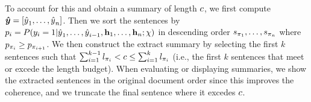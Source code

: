 To account for this and obtain a summary of length $c$, 
we first compute $\boldsymbol{\hat{y}} = \left[{\hat{y}}_1,\ldots,{\hat{y}}_n 
\right]$. Then we sort the sentences by 
$p_i = P(y_i=1|{\hat{y}}_1,\ldots,{\hat{y}}_{i-1},\mathbf{h}_1,\ldots,
\mathbf{h}_n; \chi)$ in descending order $s_{\pi_1}, \ldots, s_{\pi_n}$ where $p_{\pi_i} \ge p_{\pi_{i+1}}$. We then 
construct the extract summary by selecting the first $k$ sentences
such that $\sum_{i=1}^{k-1} l_{\pi_i} < c \le \sum_{i=1}^{k}
l_{\pi_i}$ (i.e., the first $k$ sentences that  meet 
or excede the length budget). When evaluating or displaying summaries,
we show the extracted sentences in the original document order since this
improves the coherence, and we truncate the final sentence where it
excedes $c$.











%


